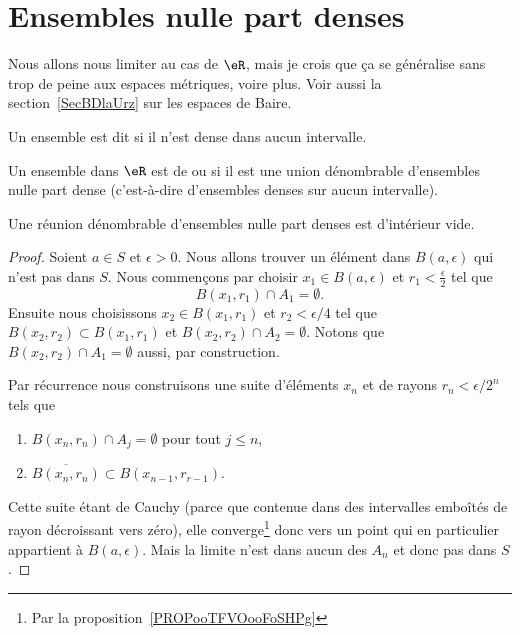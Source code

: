 \section{Ensembles nulle part denses}

Nous allons nous limiter au cas de \( \eR\), mais je crois que ça se généralise sans trop de peine aux espaces métriques, voire plus. Voir aussi la section~\ref{SecBDlaUrz} sur les espaces de Baire.

\begin{definition}
	Un ensemble est dit  si il n'est dense dans aucun intervalle.

	Un ensemble dans \( \eR\) est de  ou  si il est une union dénombrable d'ensembles nulle part dense (c'est-à-dire d'ensembles denses sur aucun intervalle).
\end{definition}

\begin{theorem}      \label{ThoQGalIO}
	Une réunion dénombrable d'ensembles nulle part denses est d'intérieur vide.
\end{theorem}

\begin{proof}
	Soient \( a\in S\) et \( \epsilon>0\). Nous allons trouver un élément dans \( B(a,\epsilon)\) qui n'est pas dans \( S\). Nous commençons par choisir \( x_1\in B(a,\epsilon)\) et \( r_1<\frac{ \epsilon }{2}\) tel que
	\begin{equation}
		B(x_1,r_1)\cap A_1=\emptyset.
	\end{equation}
	Ensuite nous choisissons \( x_2\in B(x_1,r_1)\) et \( r_2<\epsilon/4\) tel que \( B(x_2,r_2)\subset B(x_1,r_1)\) et \( B(x_2,r_2)\cap A_2=\emptyset\). Notons que \( B(x_2,r_2)\cap A_1=\emptyset\) aussi, par construction.

	Par récurrence nous construisons une suite d'éléments \( x_n\) et de rayons \( r_n<\epsilon/2^n\) tels que
	\begin{enumerate}
		\item
		      \( B(x_n,r_n)\cap A_j=\emptyset\) pour tout \( j\leq n\),
		\item
		      \( \overline{ B(x_n,r_n) }\subset B(x_{n-1},r_{r-1})\).
	\end{enumerate}
	Cette suite étant de Cauchy (parce que contenue dans des intervalles emboîtés de rayon décroissant vers zéro), elle converge\footnote{Par la proposition~\ref{PROPooTFVOooFoSHPg}} donc vers un point qui en particulier appartient à \( B(a,\epsilon)\). Mais la limite n'est dans aucun des \( A_n\) et donc pas dans \( S\).
\end{proof}

